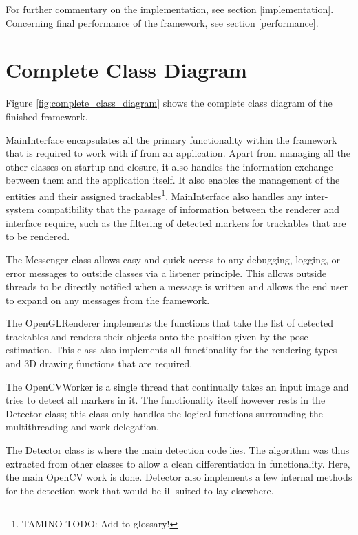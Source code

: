 For further commentary on the implementation, see section \ref{implementation}.
Concerning final performance of the framework, see section \ref{performance}.

\section{Complete Class Diagram}
\label{complete_class}

Figure \ref{fig:complete_class_diagram} shows the complete class diagram of the finished framework.

MainInterface encapsulates all the primary functionality within the framework that is required to work with if from an application.
Apart from managing all the other classes on startup and closure, it also handles the information exchange between them and the application itself.
It also enables the management of the entities and their assigned trackables\footnote{TAMINO TODO: Add to glossary!}.
MainInterface also handles any inter-system compatibility that the passage of information between the renderer and interface require, such as the filtering of detected markers for trackables that are to be rendered.

The Messenger class allows easy and quick access to any debugging, logging, or error messages to outside classes via a listener principle.
This allows outside threads to be directly notified when a message is written and allows the end user to expand on any messages from the framework.

The OpenGLRenderer implements the functions that take the list of detected trackables and renders their objects onto the position given by the pose estimation.
This class also implements all functionality for the rendering types and 3D drawing functions that are required.

The OpenCVWorker is a single thread that continually takes an input image and tries to detect all markers in it.
The functionality itself however rests in the Detector class; this class only handles the logical functions surrounding the multithreading and work delegation.

The Detector class is where the main detection code lies.
The algorithm was thus extracted from other classes to allow a clean differentiation in functionality.
Here, the main OpenCV work is done.
Detector also implements a few internal methods for the detection work that would be ill suited to lay elsewhere.


